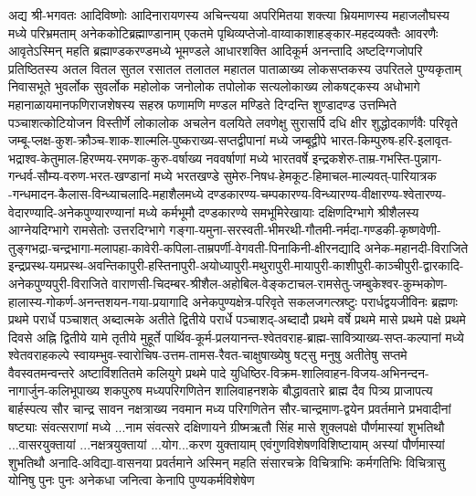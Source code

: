 अद्य श्री-भगवतः आदिविष्णोः आदिनारायणस्य अचिन्त्यया अपरिमितया शक्त्या भ्रियमाणस्य महाजलौघस्य मध्ये
परिभ्रमताम् अनेककोटिब्रह्माण्डानाम् एकतमे पृथिव्यप्तेजो-वाय्वाकाशाहङ्कार-महदव्यक्तैः आवरणैः
आवृतेऽस्मिन् महति ब्रह्माण्डकरण्डमध्ये भूमण्डले आधारशक्ति आदिकूर्म अनन्तादि अष्टदिग्गजोपरि
प्रतिष्ठितस्य अतल वितल सुतल रसातल तलातल महातल पाताळाख्य लोकसप्तकस्य उपरितले पुण्यकृताम् निवासभूते
भुवर्लोक सुवर्लोक महोलोक जनोलोक तपोलोक सत्यलोकाख्य लोकषट्कस्य अधोभागे महानाळायमानफणिराजशेषस्य सहस्र
फणामणि मण्डल मण्डिते दिग्दन्ति शुण्डादण्ड उत्तम्भिते पञ्चाशत्कोटियोजन विस्तीर्णे लोकालोक अचलेन
वलयिते लवणेक्षु सुरासर्पि दधि क्षीर शुद्धोदकार्णवैः परिवृते
जम्बू-प्लक्ष-कुश-क्रौञ्च-शाक-शाल्मलि-पुष्कराख्य-सप्तद्वीपानां मध्ये जम्बूद्वीपे
भारत-किम्पुरुष-हरि-इलावृत-भद्राश्व-केतुमाल-हिरण्मय-रमणक-कुरु-वर्षाख्य नववर्षाणां मध्ये भारतवर्षे
इन्द्रकशेरु-ताम्र-गभस्ति-पुन्नाग-गन्धर्व-सौम्य-वरुण-भरत-खण्डानां मध्ये भरतखण्डे
सुमेरु-निषध-हेमकूट-हिमाचल-माल्यवत्-पारियात्रक -गन्धमादन-कैलास-विन्ध्याचलादि-महाशैलमध्ये
दण्डकारण्य-चम्पकारण्य-विन्ध्यारण्य-वीक्षारण्य-श्वेतारण्य-वेदारण्यादि-अनेकपुण्यारण्यानां मध्ये
कर्मभूमौ दण्डकारण्ये समभूमिरेखायाः दक्षिणदिग्भागे श्रीशैलस्य आग्नेयदिग्भागे रामसेतोः उत्तरदिग्भागे
गङ्गा-यमुना-सरस्वती-भीमरथी-गौतमी-नर्मदा-गण्डकी-कृष्णवेणी-तुङ्गभद्रा-चन्द्रभागा-मलापहा-कावेरी-कपिला-ताम्रपर्णी-वेगवती-पिनाकिनी-क्षीरनद्यादि
अनेक-महानदी-विराजिते
इन्द्रप्रस्थ-यमप्रस्थ-अवन्तिकापुरी-हस्तिनापुरी-अयोध्यापुरी-मथुरापुरी-मायापुरी-काशीपुरी-काञ्चीपुरी-द्वारकादि-अनेकपुण्यपुरी-विराजिते
वाराणसी-चिदम्बर-श्रीशैल-अहोबिल-वेङ्कटाचल-रामसेतु-जम्बुकेश्वर-कुम्भकोण-हालास्य-गोकर्ण-अनन्तशयन-गया-प्रयागादि
अनेकपुण्यक्षेत्र-परिवृते सकलजगत्स्रष्टुः परार्धद्वयजीविनः ब्रह्मणः प्रथमे परार्धे पञ्चाशत्
अब्दात्मके अतीते द्वितीये परार्धे पञ्चाशद्-अब्दादौ प्रथमे वर्षे प्रथमे मासे प्रथमे पक्षे प्रथमे
दिवसे अह्नि द्वितीये यामे तृतीये मुहूर्ते
पार्थिव-कूर्म-प्रलयानन्त-श्वेतवराह-ब्राह्म-सावित्र्याख्य-सप्त-कल्पानां मध्ये श्वेतवराहकल्पे
स्वायम्भुव-स्वारोचिष-उत्तम-तामस-रैवत-चाक्षुषाख्येषु षट्सु मनुषु अतीतेषु सप्तमे वैवस्वतमन्वन्तरे
अष्टाविंशतितमे कलियुगे प्रथमे पादे युधिष्ठिर-विक्रम-शालिवाहन-विजय-अभिनन्दन-नागार्जुन-कलिभूपाख्य
शकपुरुष मध्यपरिगणितेन शालिवाहनशके बौद्धावतारे ब्राह्म दैव पित्र्य प्राजापत्य बार्हस्पत्य सौर चान्द्र
सावन नक्षत्राख्य नवमान मध्य परिगणितेन सौर-चान्द्रमाण-द्वयेन प्रवर्तमाने प्रभवादीनां षष्ट्याः
संवत्सराणां मध्ये ...नाम संवत्सरे दक्षिणायने ग्रीष्मऋतौ सिंह मासे शुक्लपक्षे पौर्णमास्यां शुभतिथौ
...वासरयुक्तायां ...नक्षत्रयुक्तायां ...योग...करण युक्तायाम् एवंगुणविशेषणविशिष्टायाम् अस्यां
पौर्णमास्यां शुभतिथौ  अनादि-अविद्या-वासनया प्रवर्तमाने अस्मिन् महति संसारचक्रे विचित्राभिः
कर्मगतिभिः विचित्रासु योनिषु पुनः पुनः अनेकधा जनित्वा केनापि पुण्यकर्मविशेषेण
